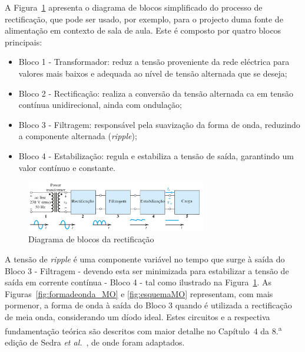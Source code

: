 A Figura~\ref{fig:blocosrectificacao} apresenta o diagrama de blocos simplificado do processo de rectificação, que pode ser usado, por exemplo, para o projecto duma fonte de alimentação em contexto de sala de aula. Este é composto por quatro blocos principais:

\begin{itemize}
    \item Bloco 1 - Transformador: reduz a tensão proveniente da rede eléctrica para valores mais baixos e adequada ao nível de tensão alternada que se deseja;
    \item Bloco 2 - Rectificação: realiza a conversão da tensão alternada \acrshort{ca} em tensão contínua unidirecional, ainda com ondulação;
    \item Bloco 3 - Filtragem: responsável pela suavização da forma de onda, reduzindo a componente alternada (\textit{ripple});
    \item Bloco 4 - Estabilização:  regula e estabiliza a tensão de saída, garantindo um valor contínuo e constante.
\end{itemize}

\begin{figure}[hbtp]
	\centering
	\includegraphics[width=0.7\textwidth]{figures/diagramablocosrectificacao.png}
	\caption{Diagrama de blocos da rectificação \cite{sedrasmith}}
	\label{fig:blocosrectificacao}
\end{figure}

A tensão de \textit{ripple} é uma componente variável no tempo que surge à saída do Bloco 3 - Filtragem -  devendo esta ser minimizada para estabilizar a tensão de saída em corrente contínua - Bloco 4 - tal como ilustrado na Figura~\ref{fig:blocosrectificacao}. As Figuras~\ref{fig:formadeonda_MO} e \ref{fig:esquemaMO} representam, com mais pormenor, a forma de onda à saída do Bloco 3 quando é utilizada a rectificação de meia onda, considerando um díodo ideal. Estes circuitos e a respectiva fundamentação teórica são descritos com maior detalhe no Capítulo~4 da 8.\textsuperscript{a} edição de Sedra \textit{et al.}~\cite{sedrasmith}, de onde foram adaptados.

